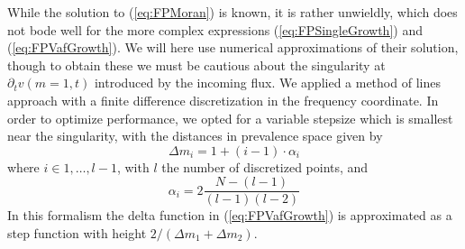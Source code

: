 \documentclass[pdftex,12pt,a4paper]{scrartcl}
\begin{document}
While the solution to (\ref{eq:FPMoran}) is known, it is rather unwieldly, which does not bode well for the more complex expressions (\ref{eq:FPSingleGrowth}) and (\ref{eq:FPVafGrowth}). We will here use numerical approximations of their solution, though to obtain these we must be cautious about the singularity at $\partial_t v(m=1, t)$ introduced by the incoming flux. We applied a method of lines approach with a finite difference discretization in the frequency coordinate. In order to optimize performance, we opted for a variable stepsize which is smallest near the singularity, with the distances in prevalence space given by
\begin{equation}
    \Delta m_i = 1 + (i-1)\cdot \alpha_i
\end{equation}
where $i \in 1, \dots, l-1$, with $l$ the number of discretized points, and
\begin{equation}
    \alpha_i = 2\frac{N-(l-1)}{(l-1)(l-2)}
\end{equation}
In this formalism the delta function in (\ref{eq:FPVafGrowth}) is approximated as a step function with height $2/(\Delta m_1 + \Delta m_2)$.
\end{document}
